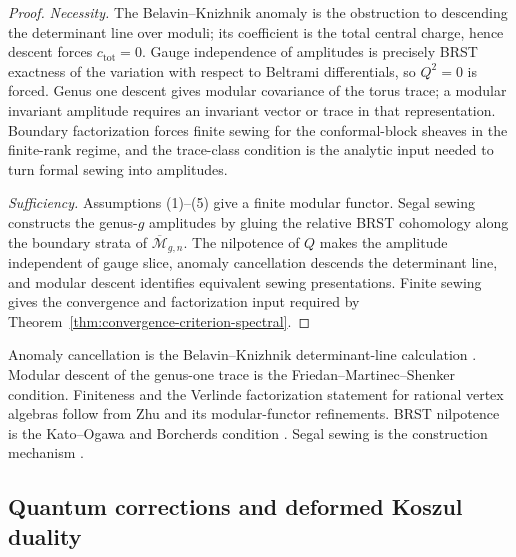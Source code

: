 \begin{proof}
\emph{Necessity.}
The Belavin--Knizhnik anomaly is the obstruction to descending the
determinant line over moduli; its coefficient is the total central
charge, hence descent forces $c_{\mathrm{tot}}=0$. Gauge independence
of amplitudes is precisely BRST exactness of the variation with
respect to Beltrami differentials, so $Q^2=0$ is forced. Genus one
descent gives modular covariance of the torus trace; a modular
invariant amplitude requires an invariant vector or trace in that
representation. Boundary factorization forces finite sewing for the
conformal-block sheaves in the finite-rank regime, and the trace-class
condition is the analytic input needed to turn formal sewing into
amplitudes.

\emph{Sufficiency.}
Assumptions (1)--(5) give a finite modular functor. Segal sewing
constructs the genus-$g$ amplitudes by gluing the relative BRST
cohomology along the boundary strata of
$\overline{\mathcal{M}}_{g,n}$. The nilpotence of $Q$ makes the
amplitude independent of gauge slice, anomaly cancellation descends
the determinant line, and modular descent identifies equivalent
sewing presentations. Finite sewing gives the convergence and
factorization input required by
Theorem~\ref{thm:convergence-criterion-spectral}.
\end{proof}

\begin{remark}[Provenance]
Anomaly cancellation is the Belavin--Knizhnik determinant-line
calculation \cite{BK86}. Modular descent of the genus-one trace is the
Friedan--Martinec--Shenker condition. Finiteness and the Verlinde
factorization statement for rational vertex algebras follow from Zhu
\cite{Zhu96} and its modular-functor refinements. BRST nilpotence is
the Kato--Ogawa and Borcherds condition \cite{Bor92}. Segal sewing is
the construction mechanism \cite{Seg04}.
\end{remark}


\subsection{Quantum corrections and deformed Koszul duality}

